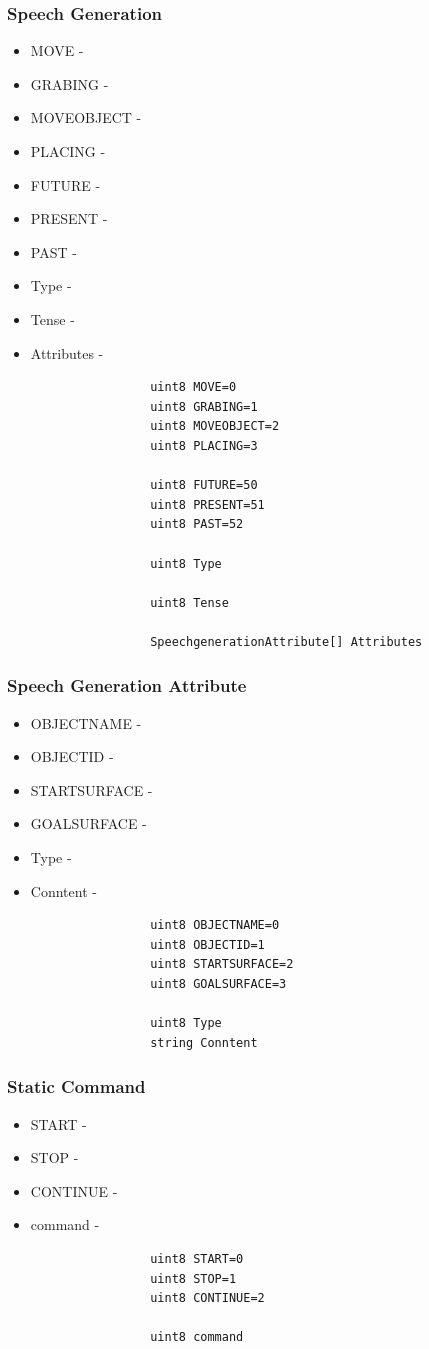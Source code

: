 \documentclass[main.tex]{subfiles}
\begin{document}
				\subsubsection{Speech Generation}
				\label{msg_speech_generation}
				\begin{itemize}
					\item MOVE -
					\item GRABING -
					\item MOVEOBJECT - 
					\item PLACING -
					\item FUTURE -
					\item PRESENT -
					\item PAST -
					\item Type -
					\item Tense -
					\item Attributes -
				\end{itemize}
					\begin{lstlisting}
					uint8 MOVE=0
					uint8 GRABING=1
					uint8 MOVEOBJECT=2
					uint8 PLACING=3
		
					uint8 FUTURE=50
					uint8 PRESENT=51
					uint8 PAST=52
		
					uint8 Type
		
					uint8 Tense
		
					SpeechgenerationAttribute[] Attributes
					\end{lstlisting}
				\subsubsection{Speech Generation Attribute}
				\label{msg_speech_generation_attribute}
				\begin{itemize}
					\item OBJECTNAME -
					\item OBJECTID -
					\item STARTSURFACE - 
					\item GOALSURFACE -
					\item Type -
					\item Conntent -
				\end{itemize}
					\begin{lstlisting}
					uint8 OBJECTNAME=0
					uint8 OBJECTID=1
					uint8 STARTSURFACE=2
					uint8 GOALSURFACE=3
					
					uint8 Type
					string Conntent
					\end{lstlisting}
				\subsubsection{Static Command}
				\label{msg_static_command}
				\begin{itemize}
					\item START -
					\item STOP -
					\item CONTINUE - 
					\item command -
				\end{itemize}
					\begin{lstlisting}
					uint8 START=0
					uint8 STOP=1
					uint8 CONTINUE=2
		
					uint8 command
					\end{lstlisting}
\end{document}
